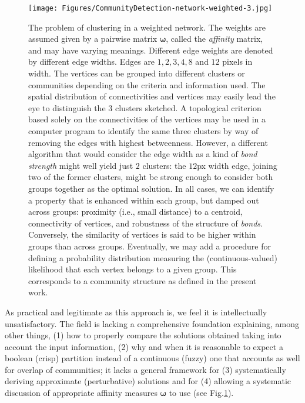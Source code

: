 \documentclass[twocolumn,aps,sort,nofootinbib]{revtex4}
\begin{document}
\begin{figure}
\centering
\texttt{[image: Figures/CommunityDetection-network-weighted-3.jpg]}
\caption{The problem of clustering in a weighted network. 
The weights are assumed given by a pairwise matrix $\boldsymbol{\omega}$,
called the {\sl affinity} matrix, and may have varying meanings.
Different edge weights
are denoted by different edge widths.
Edges are $1,2,3,4,8$ and $12$ pixels in width.
The vertices can be grouped into different clusters or communities
depending on the criteria and information used.
The spatial distribution of connectivities and vertices may easily
lead the eye to distinguish the $3$ clusters sketched. 
A topological criterion based solely on the connectivities of 
the vertices may be used in a computer program to 
identify the same three clusters by way of
removing the edges with highest betweenness. 
However, a different algorithm that would consider
the edge width as a kind of {\em bond strength}
might well yield just $2$ clusters:
the $12$px width edge, joining two of the former
clusters, might be strong enough to consider both groups 
together as the optimal solution. 
In all cases, we can identify a property that is enhanced
within each group, but damped out across groups: 
proximity (i.e., small distance) to a centroid,
connectivity of vertices, and robustness of
the structure of {\em bonds}. Conversely, the similarity of vertices
is said to be higher within groups than across groups.
Eventually, we may add a procedure for defining a 
probability distribution measuring the (continuous-valued)
likelihood that each vertex belongs to a given group. This
corresponds to a community structure as defined in the
present work.
}
\label{ExampleCommunityDetection}
\end{figure}

As practical and legitimate as this approach is, we feel 
it is intellectually unsatisfactory. The field is 
lacking a comprehensive foundation explaining,
among other things, (1) how
to properly compare the solutions obtained taking into
account the input information, (2) why and when it is
reasonable to expect a boolean (crisp) partition instead of a
continuous (fuzzy) one that accounts as well for overlap of communities; 
it lacks a general framework for
(3) systematically deriving approximate (perturbative) 
solutions and for (4) allowing
a systematic discussion of appropriate 
affinity %
measures $\boldsymbol\omega$ to use (see Fig.\ref{ExampleCommunityDetection}). 
\end{document}
